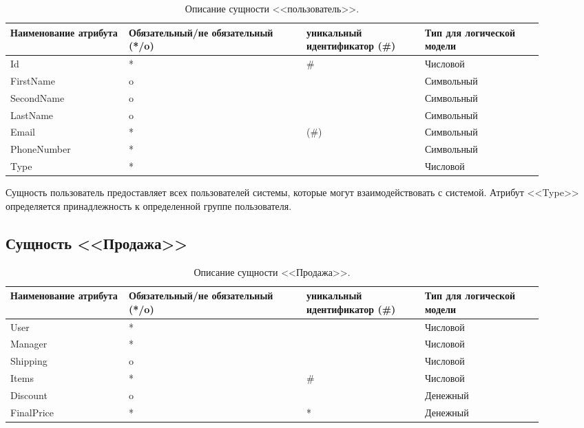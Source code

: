 \documentclass[14pt]{extreport}
\begin{document}
            \begin{table}[H]
                \begin{tabular}{|p{0.2\linewidth}|p{0.3\linewidth}|p{0.2\linewidth}|p{0.2\linewidth}|}
                    \hline
                    Наименование атрибута & Обязательный/не обязательный (*/o) & уникальный идентификатор (\#) & Тип для логической модели
                    \\ \hline
                    Id & * & \# & Числовой \\ \hline
                    FirstName & o & & Символьный\\ \hline
                    SecondName & o & & Символьный\\ \hline
                    LastName & o & & Символьный \\ \hline
                    Email & * & (\#) & Символьный  \\ \hline
                    PhoneNumber & * & & Символьный\\ \hline
                    Type & * & & Числовой \\ \hline
                \end{tabular}

                \caption{Описание сущности <<пользователь>>.}
            \end{table}
        
        Сущность пользователь предоставляет всех пользователей системы, которые могут взаимодействовать с системой. Атрибут <<Type>> определяется принадлежность к определенной группе пользователя.

    \subsection*{Сущность <<Продажа>>}

        \begin{table}[H]
            \begin{tabular}{|p{0.2\linewidth}|p{0.3\linewidth}|p{0.2\linewidth}|p{0.2\linewidth}|}
                \hline
                Наименование атрибута & Обязательный/не обязательный (*/o) & уникальный идентификатор (\#) & Тип для логической модели
                \\ \hline
                User & * & & Числовой\\ \hline
                Manager & * & & Числовой\\ \hline
                Shipping & o & & Числовой \\ \hline
                Items & * & \# & Числовой  \\ \hline
                Discount & o & & Денежный \\ \hline  
                FinalPrice & * & * & Денежный \\ \hline
            \end{tabular}
            \caption{Описание сущности <<Продажа>>.}
        \end{table}
\end{document}
